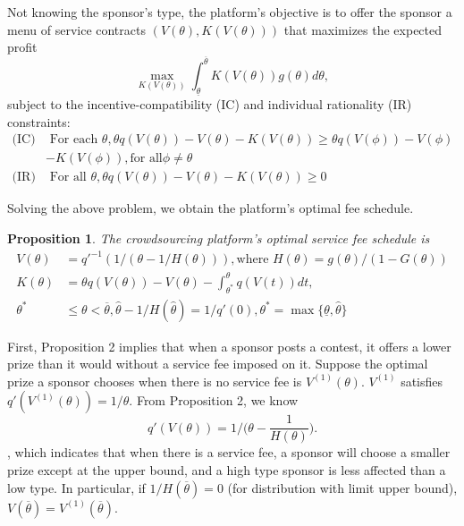 \documentclass[12pt]{article}
\newtheorem{Proposition}{Proposition}
\begin{document}
Not knowing the sponsor's type, the platform's objective is to
offer the sponsor a menu of service contracts $(V(\theta),K(V(\theta)))$
that maximizes the expected profit
\begin{equation}\label{UCSR}
\max_{K(V(\theta))}\int_{\underline{\theta}}^{\overline{\theta}}K(V(\theta))g(\theta)d\theta,
\end{equation}
subject to the incentive-compatibility (IC) and individual rationality
(IR) constraints:
\begin{align*}
\text{(IC)} & \text{ For each }\theta,\theta q(V(\theta))-V(\theta)-K(V(\theta))\geq\theta q(V(\phi))-V(\phi)\\
 & -K(V(\phi)),\text{for all}\phi\neq\theta\\
\text{(IR)} & \text{ For all }\theta,\theta q(V(\theta))-V(\theta)-K(V(\theta))\geq0
\end{align*}

Solving the above problem, we obtain the platform's optimal fee schedule.

\begin{Proposition}\label{V_solution}
The crowdsourcing platform's optimal service fee schedule is
\begin{align}
V(\theta) & =q'^{-1}(1/(\theta-1/H(\theta))), \text{where }  H(\theta)=g(\theta)/(1-G(\theta))\\
K(\theta) & =\theta q(V(\theta))-V(\theta)-\int_{\theta^{*}}^{\theta}q(V(t))dt,\\
\theta^{*} & \leq\theta<\overline{\theta}, \hat{\theta}-1/H(\hat{\theta})=1/q'(0),\theta^{*}=\max \{\underline{\theta},\hat{\theta}\}
\end{align}
\end{Proposition}

First, Proposition 2 implies that when a sponsor posts a contest, it offers a lower
prize than it would without a service fee imposed on it. Suppose the
optimal prize a sponsor chooses when there is no service fee is $V^{(1)}(\theta)$.
$V^{(1)}$ satisfies $q'(V^{(1)}(\theta))=1/\theta$. From Proposition 2, we know
\begin{equation}
q'(V(\theta))=1\Big/\Big(\theta-\frac{1}{H(\theta)}\Big).\label{csfocc}
\end{equation},
which indicates that when there is a service fee, a sponsor will choose
a smaller prize except at the upper bound, and a high type sponsor is
less affected than a low type. In particular, if $1/H(\overline{\theta})=0$
(for distribution with limit upper bound), $V(\overline{\theta})=V^{(1)}(\overline{\theta})$.
\end{document}
